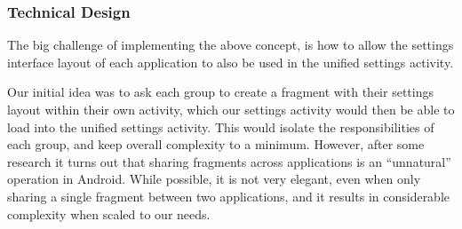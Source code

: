 \subsubsection{Technical Design}
The big challenge of implementing the above concept, is how to allow the settings interface layout of each application to also be used in the unified settings activity. 

Our initial idea was to ask each group to create a fragment with their settings layout within their own activity, which our settings activity would then be able to load into the unified settings activity. This would isolate the responsibilities of each group, and keep overall complexity to a minimum. However, after some research it turns out that sharing fragments across applications is an ``unnatural'' operation in Android. While possible, it is not very elegant, even when only sharing a single fragment between two applications, and it results in considerable complexity when scaled to our needs. 
